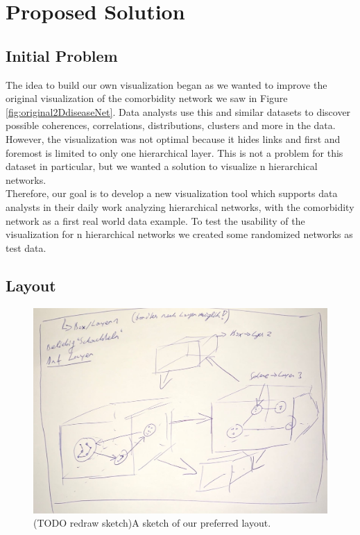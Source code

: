 \chapter{Proposed Solution}

\section{Initial Problem}

The idea to build our own visualization began as we wanted to improve the original visualization of the comorbidity network we saw in Figure \ref{fig:original2DdiseaseNet}. Data analysts use this and similar datasets to discover possible coherences, correlations, distributions, clusters and more in the data. 
However, the visualization was not optimal because it hides links and first and foremost is limited to only one hierarchical layer. This is not a problem for this dataset in particular, but we wanted a solution to visualize n hierarchical networks.\\
Therefore, our goal is to develop a new visualization tool which supports data analysts in their daily work analyzing hierarchical networks, with the comorbidity network as a first real world data example. To test the usability of the visualization for n hierarchical networks we created some randomized networks as test data. 

\section{Layout}

\begin{figure}[h]
    \centering
    \includegraphics[width=1\textwidth]{chapters/graphics/concept1.jpg}
    \caption{(TODO redraw sketch)A sketch of our preferred layout. } 
    \label{fig:layoutSketch} 
\end{figure}

